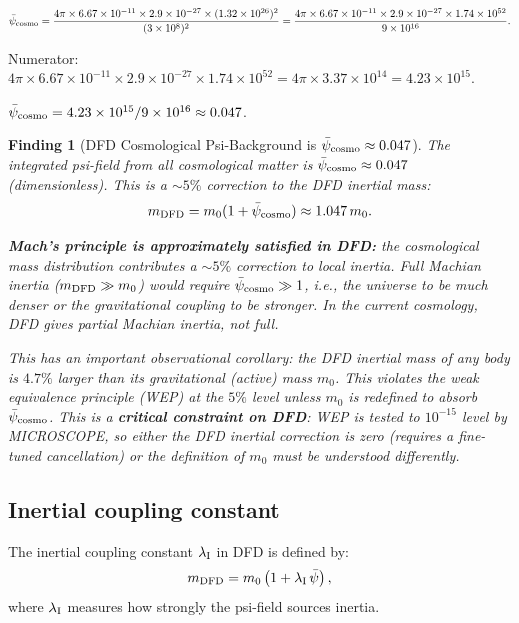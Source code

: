 \documentclass[11pt]{article}
\newtheorem{finding}{Finding}
\newcommand{\ee}[1]{\times 10^{#1}}
\newcommand{\psibar}{\bar{\psi}}
\newcommand{\lambdaI}{\lambda_{\rm I}}
\begin{document}
\begin{equation}
\psibar_{\rm cosmo} = \frac{4\pi\times 6.67\ee{-11}\times 2.9\ee{-27}\times(1.32\ee{26})^2}{(3\ee{8})^2}
= \frac{4\pi\times 6.67\ee{-11}\times 2.9\ee{-27}\times 1.74\ee{52}}{9\ee{16}}.
\end{equation}

Numerator: $4\pi\times 6.67\ee{-11}\times 2.9\ee{-27}\times 1.74\ee{52}
= 4\pi\times 3.37\ee{14} = 4.23\ee{15}$.

$\psibar_{\rm cosmo} = 4.23\ee{15}/9\ee{16} \approx 0.047$.

\begin{finding}[DFD Cosmological Psi-Background is $\psibar_{\rm cosmo} \approx 0.047$]
The integrated psi-field from all cosmological matter is
$\psibar_{\rm cosmo} \approx 0.047$ (dimensionless). This is a $\sim 5\%$
correction to the DFD inertial mass:
\begin{equation}
m_{\rm DFD} = m_0(1 + \psibar_{\rm cosmo}) \approx 1.047\,m_0.
\label{eq:mach-correction}
\end{equation}

\textbf{Mach's principle is \emph{approximately} satisfied in DFD:}
the cosmological mass distribution contributes a $\sim 5\%$ correction to local
inertia. Full Machian inertia ($m_{\rm DFD} \gg m_0$) would require
$\psibar_{\rm cosmo} \gg 1$, i.e., the universe to be much denser or the
gravitational coupling to be stronger. In the current cosmology, DFD gives
partial Machian inertia, not full.

This has an important observational corollary: the DFD inertial mass of any
body is $4.7\%$ larger than its gravitational (active) mass $m_0$. This
\emph{violates} the weak equivalence principle (WEP) at the $5\%$ level
unless $m_0$ is redefined to absorb $\psibar_{\rm cosmo}$. This is a
\textbf{critical constraint on DFD}: WEP is tested to $10^{-15}$ level by
MICROSCOPE, so either the DFD inertial correction is zero (requires a
fine-tuned cancellation) or the definition of $m_0$ must be understood
differently.
\end{finding}

\subsection{Inertial coupling constant}

The inertial coupling constant $\lambdaI$ in DFD is defined by:
\begin{equation}
m_{\rm DFD} = m_0\left(1 + \lambdaI\,\psibar\right),
\label{eq:mDFD-lambda}
\end{equation}
where $\lambdaI$ measures how strongly the psi-field sources inertia.
\end{document}
